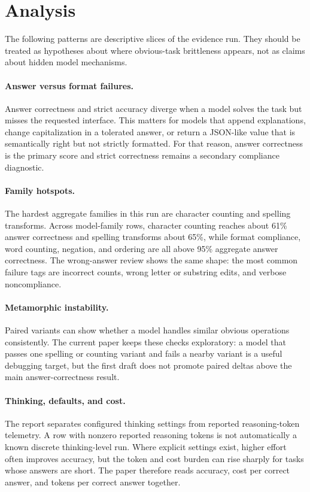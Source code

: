 \section{Analysis}

The following patterns are descriptive slices of the evidence run. They should
be treated as hypotheses about where obvious-task brittleness appears, not as
claims about hidden model mechanisms.

\paragraph{Answer versus format failures.}
Answer correctness and strict accuracy diverge when a model solves the task but
misses the requested interface. This matters for models that append
explanations, change capitalization in a tolerated answer, or return a
JSON-like value that is semantically right but not strictly formatted. For that
reason, answer correctness is the primary score and strict correctness remains
a secondary compliance diagnostic.

\paragraph{Family hotspots.}
The hardest aggregate families in this run are character counting and spelling
transforms. Across model-family rows, character counting reaches about 61\%
answer correctness and spelling transforms about 65\%, while format
compliance, word counting, negation, and ordering are all above 95\% aggregate
answer correctness. The wrong-answer review shows the same shape: the most
common failure tags are incorrect counts, wrong letter or substring edits, and
verbose noncompliance.

\paragraph{Metamorphic instability.}
Paired variants can show whether a model handles similar obvious operations
consistently. The current paper keeps these checks exploratory: a model that
passes one spelling or counting variant and fails a nearby variant is a useful
debugging target, but the first draft does not promote paired deltas above the
main answer-correctness result.

\paragraph{Thinking, defaults, and cost.}
The report separates configured thinking settings from reported reasoning-token
telemetry. A row with nonzero reported reasoning tokens is not automatically a
known discrete thinking-level run. Where explicit settings exist, higher effort
often improves accuracy, but the token and cost burden can rise sharply for
tasks whose answers are short. The paper therefore reads accuracy, cost per
correct answer, and tokens per correct answer together.

